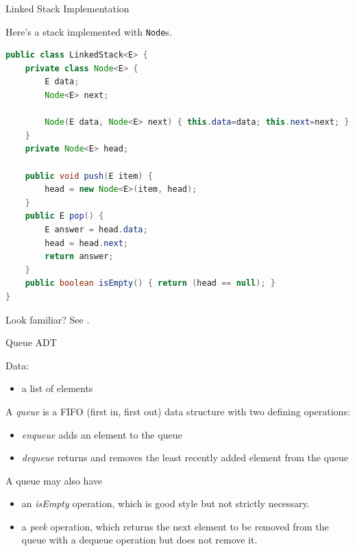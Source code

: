 \documentclass{beamer}
\begin{document}
\begin{frame}[fragile]{Linked Stack Implementation}


Here's a stack implemented with {\tt Node}s.
\begin{lstlisting}[language=Java]
public class LinkedStack<E> {
    private class Node<E> {
        E data;
        Node<E> next;

        Node(E data, Node<E> next) { this.data=data; this.next=next; }
    }
    private Node<E> head;

    public void push(E item) {
        head = new Node<E>(item, head);
    }
    public E pop() {
        E answer = head.data;
        head = head.next;
        return answer;
    }
    public boolean isEmpty() { return (head == null); }
}
\end{lstlisting}
\vspace{-.05in}
Look familiar? See .

\end{frame}

\begin{frame}[fragile]{Queue ADT}

Data:
\begin{itemize}
  \item a list of elements
\end{itemize}

A {\it queue} is a FIFO (first in, first out) data structure with two defining operations:
\begin{itemize}
\item {\it enqueue} adds an element to the queue
\item {\it dequeue} returns and removes the least recently added element from the queue
\end{itemize}

A queue may also have
\begin{itemize}
\item an {\it isEmpty} operation, which is good style but not strictly necessary.
\item a {\it peek} operation, which returns the next element to be removed from the queue with a dequeue operation but does not remove it.
\end{itemize}

\end{frame}
\end{document}
